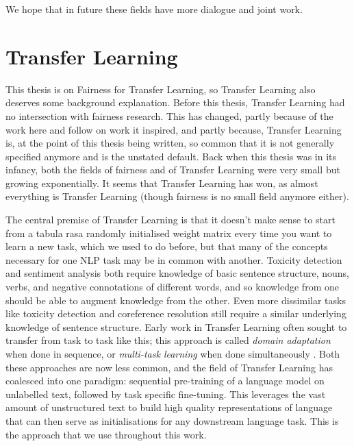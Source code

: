 We hope that in future these fields have more dialogue and joint work. 

\section{Transfer Learning}
\label{sec:bg_transfer_learning}
This thesis is on Fairness for Transfer Learning, so Transfer Learning also deserves some background explanation. Before this thesis, Transfer Learning had no intersection with fairness research. This has changed, partly because of the work here and follow on work it inspired, and partly because, Transfer Learning is, at the point of this thesis being written, so common that it is not generally specified anymore and is the unstated default. Back when this thesis was in its infancy, both the fields of fairness and of Transfer Learning were very small but growing exponentially. It seems that Transfer Learning has won, as almost everything is Transfer Learning (though fairness is no small field anymore either).

The central premise of Transfer Learning is that it doesn't make sense to start from a tabula rasa randomly initialised weight matrix every time you want to learn a new task, which we used to do before, but that many of the concepts necessary for one NLP task may be in common with another. Toxicity detection and sentiment analysis both require knowledge of basic sentence structure, nouns, verbs, and negative connotations of different words, and so knowledge from one should be able to augment knowledge from the other. Even more dissimilar tasks like toxicity detection and coreference resolution still require a similar underlying knowledge of sentence structure. Early work in Transfer Learning often sought to transfer from task to task like this; this approach is called \textit{domain adaptation} when done in sequence, or \textit{multi-task learning} when done simultaneously \citep{ruder2019transfer}. Both these approaches are now less common, and the field of Transfer Learning has coalesced into one paradigm: sequential pre-training of a language model on unlabelled text, followed by task specific fine-tuning. This leverages the vast amount of unstructured text to build high quality representations of language that can then serve as initialisations for any downstream language task. This is the approach that we use throughout this work.

